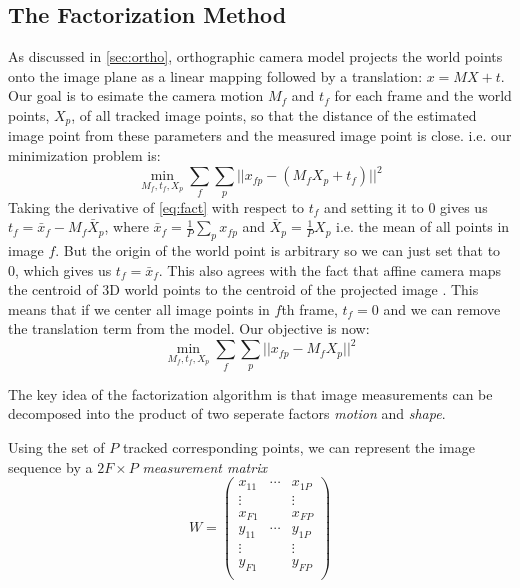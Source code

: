 \subsection{The Factorization Method}
\label{sec:fact}
As discussed in \ref{sec:ortho}, orthographic camera model projects
the world points onto the image plane as a linear mapping followed by
a translation: $x=MX + t$. Our goal is to esimate the camera motion
$M_f$ and $t_f$ for each frame and the world points, $X_p$, of all tracked
image points, so that the distance of the estimated image point from
these parameters and the measured image point is close. i.e. our
minimization problem is:
\begin{equation}
  \label{eq:fact}
\min_{M_f, t_f, X_p}\sum_{f}\sum_p ||x_{fp} - (M_fX_p + t_f)||^2  
\end{equation}
Taking the derivative of \eqref{eq:fact} with respect to $t_f$ and
setting it to 0 gives us $t_f = \bar x_f - M_f \bar X_p$, where $\bar
x_f =\frac{1}{P}\sum_p x_{fp}$ and $\bar X_p = \frac{1}{P}X_p$
i.e. the mean of all points in image $f$. But the origin of the world
point is arbitrary so we can just set that to 0, which gives us $t_f =
\bar x_f$. This also agrees with the fact that affine camera maps the
centroid of 3D world points to the centroid of the projected image
\cite[p438]{AZ}. This means that if we center all image points in $f$th
frame, $t_f=0$ and we can remove the translation term from the
model. Our objective is now: 
\begin{equation}
  \label{eq:fact2}
\min_{M_f, t_f, X_p}\sum_{f}\sum_p ||x_{fp} - M_fX_p||^2  
\end{equation}

The key idea of the factorization algorithm is that image measurements
can be decomposed into the product of two seperate factors
\emph{motion} and \emph{shape}. 

Using the set of $P$ tracked corresponding
points, we can represent the image sequence by a $2F\times P$ \emph{measurement matrix
}$$W =
\begin{pmatrix}
  x_{11} & \cdots & x_{1P}\\
  \vdots &  & \vdots \\
  x_{F1} & & x_{FP}\\
  y_{11} & \cdots & y_{1P}\\
  \vdots &  & \vdots \\
  y_{F1} & & y_{FP}\\
\end{pmatrix}
$$

